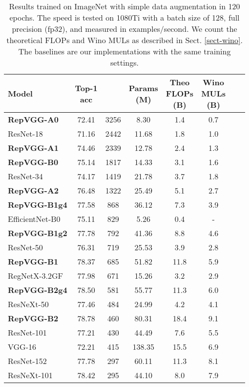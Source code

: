 \documentclass[final]{cvpr}
\begin{document}
\setlength{\tabcolsep}{4pt}
\begin{table}
	\caption{Results trained on ImageNet with simple data augmentation in 120 epochs. The speed is tested on 1080Ti with a batch size of 128, full precision (fp32), and measured in examples/second. We count the theoretical FLOPs and Wino MULs as described in Sect. \ref{sect-wino}. The baselines are our implementations with the same training settings.}
	\label{table-weak}
	\vspace{-0.2in}
	\begin{center}		
		\small
		\begin{tabular}{lccccccc}
			\hline
			Model			&	\makecell{Top-1 \\ acc}		&	 \makecell{Speed} 	&	\makecell{Params \\ (M)}	&\makecell{Theo \\ FLOPs \\ (B)}		&\makecell{Wino \\ MULs \\ (B)}	\\
			\hline
			\textbf{RepVGG-A0} & 72.41 & 3256 & 8.30 & 1.4 & 0.7 \\
			ResNet-18 & 71.16 & 2442 & 11.68 & 1.8 & 1.0 \\
			\hline
			\textbf{RepVGG-A1} & 74.46 & 2339 & 12.78 & 2.4 & 1.3 \\
			\textbf{RepVGG-B0} & 75.14 & 1817 & 14.33 & 3.1 & 1.6 \\
			ResNet-34 & 74.17 & 1419 & 21.78 & 3.7 & 1.8 \\
			\hline
			\textbf{RepVGG-A2} & 76.48 & 1322 & 25.49 & 5.1 & 2.7 \\
			\textbf{RepVGG-B1g4} & 77.58 & 868 & 36.12 & 7.3 & 3.9 \\
			EfficientNet-B0 & 75.11 & 829 & 5.26 & 0.4 & - \\
			\hline
			\textbf{RepVGG-B1g2} & 77.78 & 792 & 41.36 & 8.8 & 4.6 \\
			ResNet-50 & 76.31 & 719 & 25.53 & 3.9 & 2.8 \\
			\hline 
			\textbf{RepVGG-B1} & 78.37 & 685 & 51.82 & 11.8 & 5.9 \\
			RegNetX-3.2GF & 77.98 & 671 & 15.26 & 3.2 & 2.9 \\
			\hline
			\textbf{RepVGG-B2g4} & 78.50 & 581 & 55.77 & 11.3 & 6.0 \\
			ResNeXt-50 & 77.46 & 484 & 24.99 & 4.2 & 4.1 \\
			\hline
			\textbf{RepVGG-B2} & 78.78 & 460 & 80.31 & 18.4 & 9.1 \\
			ResNet-101 & 77.21 & 430 & 44.49 & 7.6 & 5.5 \\
			VGG-16 & 72.21 & 415 & 138.35 & 15.5 & 6.9 \\
			ResNet-152 & 77.78 & 297 & 60.11 & 11.3 & 8.1 \\
			ResNeXt-101 & 78.42 & 295 & 44.10 & 8.0 & 7.9 \\
			\hline
		\end{tabular}
	\end{center}
	\vspace{-0.2in}
\end{table}
\setlength{\tabcolsep}{1.4pt}
\end{document}
